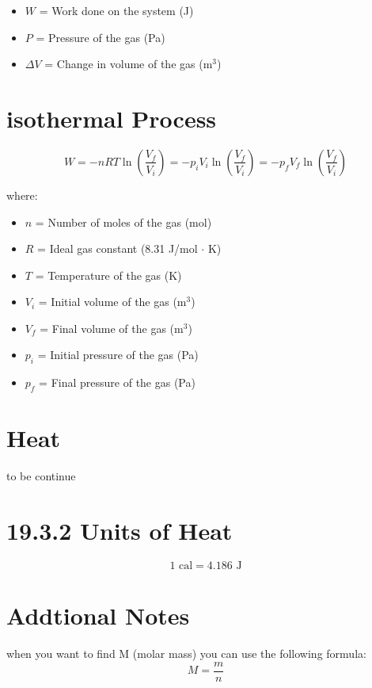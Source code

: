 \documentclass{article}
\begin{document}
    
    \begin{itemize}
        \item $W$ = Work done on the system (J)
        \item $P$ = Pressure of the gas (Pa)
        \item $\Delta V$ = Change in volume of the gas (m$^3$)
    \end{itemize}

\section*{isothermal Process}

\begin{equation}
    W = - nRT \ln \left( \frac{V_f}{V_i} \right) = - p_i V_i \ln \left( \frac{V_f}{V_i} \right) = - p_f V_f \ln \left( \frac{V_f}{V_i} \right)
\end{equation}

where:
\begin{itemize}
    \item $n$ = Number of moles of the gas (mol)
    \item $R$ = Ideal gas constant (8.31 J/mol $\cdot$ K)
    \item $T$ = Temperature of the gas (K)
    \item $V_i$ = Initial volume of the gas (m$^3$)
    \item $V_f$ = Final volume of the gas (m$^3$)
    \item $p_i$ = Initial pressure of the gas (Pa)
    \item $p_f$ = Final pressure of the gas (Pa)
\end{itemize}

\section*{Heat}

to be continue

\section*{19.3.2 Units of Heat}

\begin{equation}
    1 \text{ cal} = 4.186 \text{ J}
\end{equation}

\section*{Addtional Notes}
when you want to find M (molar mass) you can use the following formula:
\begin{equation}
    M = \frac{m}{n}
\end{equation}
\end{document}

